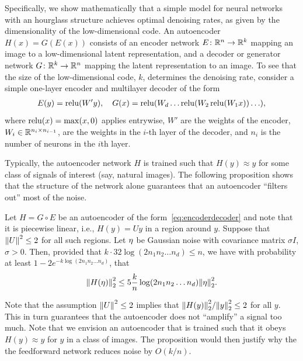 Specifically, we show mathematically that a simple model for neural networks with an hourglass structure achieves optimal denoising rates, as given by the dimensionality of the low-dimensional code.
An autoencoder $H(x) = G( E(x) )$ 
consists of an encoder network $E \colon \reals^n \to \reals^k$ mapping an image to a low-dimensional latent representation, and a decoder or generator network 
$G \colon \reals^k \to \reals^n$
mapping the latent representation to an image. 
To see that the size of the low-dimensional code, $k$, determines the denoising rate, consider a simple one-layer encoder and multilayer decoder of the form
\begin{align}
\label{eq:encoderdecoder}
E(y)
=
\relu(W'y)
,
\quad
G(x) = \relu(\Win{d} \ldots \relu (\Win{2} \relu(\Win{1} x)) \ldots ),
\end{align}
where $\relu(x) = \max(x, 0)$ applies entrywise,
$W'$ are the weights of the encoder, 
$W_i \in \R^{n_i \times n_{i-1}}$, are the weights in the $i$-th layer of the decoder, and $n_i$ is the number of neurons in the $i$th layer.

Typically, the autoencoder network $H$ is trained such that 
$H(y) \approx y$ for some class of signals of interest (say, natural images).
The following proposition shows that the structure of the network alone guarantees that an autoencoder ``filters out'' most of the noise. %

\begin{proposition}
\label{prop:autodec}
Let $H = G \circ E$ be an autoencoder of the form~\eqref{eq:encoderdecoder} and note that it is piecewise linear, i.e., $H(y) = Uy$ in a region around $y$. 
Suppose that $\norm{U}^2 \leq  2$ for all such  regions. 
Let $\noise$ be Gaussian noise with covariance matrix $\sigma I$, $\sigma > 0$. Then, provided that 
$ k\cdot 32 \log(2n_1 n_2 \ldots n_d)   \leq n$, we have 
with probability at least $1 - 2 e^{-k \log(2n_1 n_2 \ldots n_d)}$, that 
\[
\norm[2]{H(\eta)}^2 \leq  
5\frac{k}{n} \log(2n_1 n_2 \ldots n_d) \norm[2]{\eta}^2.
\]
\end{proposition}

Note that the assumption $\norm{U}^2 \leq 2$ implies that
$\norm[2]{H(y)}^2 / \norm[2]{y}^2 \leq 2$ for all $y$. This in turn guarantees that the autoencoder does not ``amplify'' a signal too much.
 Note that we envision an autoencoder that is trained such that it obeys $H(y) \approx y$ for $y$ in a class of images. %
 The proposition would then justify why the the feedforward network reduces noise by $O(k/n)$. %

